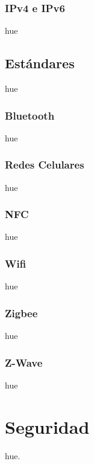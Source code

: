 \subsubsection{IPv4 e IPv6}
hue
\subsection{Estándares}
hue
\subsubsection{Bluetooth}
hue
\subsubsection{Redes Celulares}
hue
\subsubsection{NFC}
hue
\subsubsection{Wifi}
hue
\subsubsection{Zigbee}
hue
\subsubsection{Z-Wave}
hue

\section{Seguridad}
hue.
